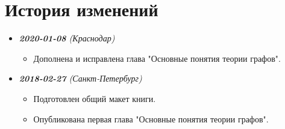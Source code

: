 
\chapter{История изменений}

\begin{itemize}
	\item \textit{\textbf{2020-01-08} (Краснодар)}
	\begin{itemize}
		\item Дополнена и исправлена глава "Основные понятия теории графов".
	\end{itemize}

	\item \textit{\textbf{2018-02-27} (Санкт-Петербург)}
	\begin{itemize}
		\item Подготовлен общий макет книги.
		\item Опубликована первая глава "Основные понятия теории графов".
	\end{itemize}
\end{itemize}